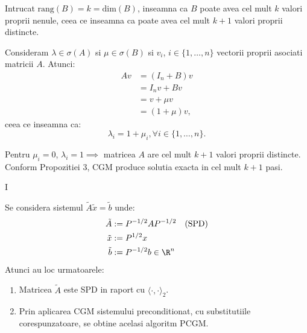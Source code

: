 \begin{demonstratie}
    Intrucat $ \text{rang}(B) = k = \text{dim}(B) $, inseamna ca $ B $ poate avea cel mult $k$ valori proprii nenule, ceea ce inseamna ca poate avea cel mult $ k + 1 $ valori proprii distincte.

    \smallskip

    Consideram $\lambda \in \sigma(A)$ si $ \mu \in \sigma(B)$ si $ v_i$, $ i \in \{ 1, \dots, n\}$ vectorii proprii asociati matricii $ A $. Atunci:
    \begin{align*}
        A v &= (I_n + B) v \\
        &= I_n v + B v \\
        &= v + \mu v \\
        &= (1 + \mu) v,
    \end{align*}
    ceea ce inseamna ca:
    $$
    \lambda_i = 1 + \mu_i, \forall i \in \{1, \dots, n \}.
    $$

    Pentru $ \mu_i = 0 $, $ \lambda_i = 1 \implies $ matricea $ A $ are cel mult $ k + 1 $ valori proprii distincte. Conform Propozitiei 3, CGM produce solutia exacta in cel mult $ k + 1 $ pasi.

\end{demonstratie}

\newpage

\begin{observatie}{I}

    Se considera sistemul $\tilde{A} \tilde{x} = \tilde{b}$ unde:
    \begin{align*}
        \tilde{A} &:= P^{-1/2} A P^{-1/2} \quad (\text{SPD}) \\
        \tilde{x} &:= P^{1/2} x \\
        \tilde{b} &:= P^{-1/2} b \in \R^n
    \end{align*}
    Atunci au loc urmatoarele:
    \begin{enumerate}
        \item[(1)] Matricea $\tilde{A}$ este SPD in raport cu $\langle \cdot, \cdot \rangle_2$.
        \item[(2)] Prin aplicarea CGM sistemului preconditionat, cu substitutiile corespunzatoare, se obtine acelasi algoritm PCGM.
    \end{enumerate}

\end{observatie}

